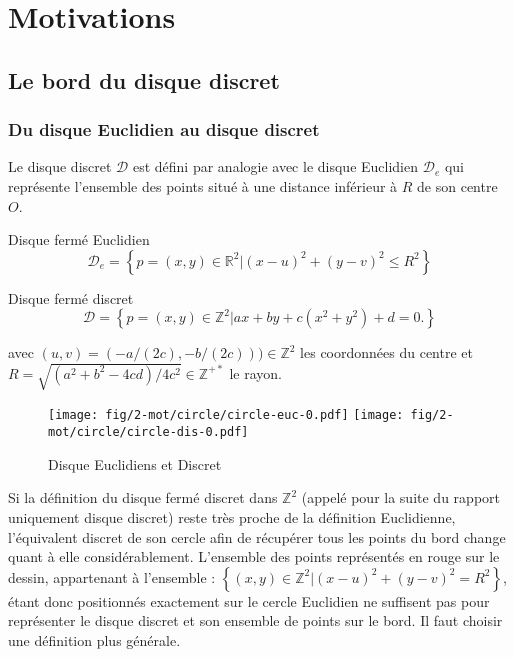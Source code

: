 \section{Motivations}

\subsection{Le bord du disque discret}

\subsubsection{Du disque Euclidien au disque discret}


Le disque discret $\mathcal{D}$ est défini par analogie avec le disque Euclidien $\mathcal{D}_e$ qui représente l'ensemble des points situé à une distance inférieur à $R$ de son centre $O$.


\begin{Definition}{Disque fermé Euclidien}
\label{def:disk-euc}
 $$\mathcal{D}_e =  \left\{ p=(x,y) \in \mathbb{R}^{2} |  (x - u)^2 + (y - v)^2 \leq R^2 \right\}$$
\end{Definition}

\begin{Definition}{Disque fermé discret}
\label{def:disk-dis}
  $$\mathcal{D} =  \left\{ p=(x,y) \in \mathbb{Z}^{2} |  ax + by + c( x^2 + y^2 ) + d = 0. \right\}$$
  
  avec $(u,v) = ( -a/(2c) , -b/(2c) )) \in \mathbb{Z}^{2}$ les coordonnées du centre et $R = \sqrt{ (a^2 + b^2 - 4cd) / 4c^2 } \in \mathbb{Z}^{+*}$ le rayon.\\
\end{Definition}

\begin{figure}[H]
  \centering
  \texttt{[image: fig/2-mot/circle/circle-euc-0.pdf]}
  \texttt{[image: fig/2-mot/circle/circle-dis-0.pdf]}
  \caption{Disque Euclidiens et Discret}
\end{figure}


Si la définition du disque fermé discret dans $\mathbb{Z}^{2}$ (appelé pour la suite du rapport uniquement disque discret) reste très proche de la définition Euclidienne, l'équivalent discret de son cercle afin de récupérer tous les points du bord change quant à elle considérablement. L'ensemble des points représentés en rouge sur le dessin, appartenant à l'ensemble : $\left\{ (x,y) \in \mathbb{Z}^{2} |  (x - u)^2 + (y - v)^2 = R^2 \right\}$, étant donc positionnés exactement sur le cercle Euclidien ne suffisent pas pour représenter le disque discret et son ensemble de points sur le bord. Il faut choisir une définition plus générale.

